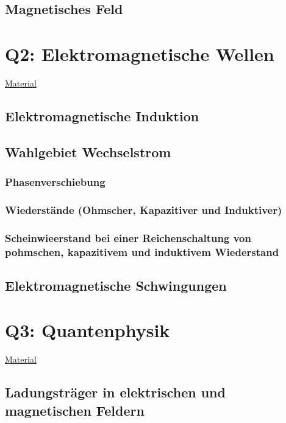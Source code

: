 \documentclass{article}
\begin{document}
        \subsection{Magnetisches Feld}

    \section{Q2: Elektromagnetische Wellen}

    \href{https://gcm.schule/material/2023/physik/lk12/#q1}{Material}
    	\subsection{Elektromagnetische Induktion}
    	
    	\subsection{Wahlgebiet Wechselstrom}
    	
    		\subsubsection{Phasenverschiebung}
    		
    		\subsubsection{Wiederstände (Ohmscher, Kapazitiver und Induktiver)}
    		
    		\subsubsection{Scheinwieerstand bei einer Reichenschaltung von pohmschen, kapazitivem und induktivem Wiederstand}
    	
    	\subsection{Elektromagnetische Schwingungen}

    \section{Q3: Quantenphysik}

    \href{https://gcm.schule/material/2022/physik/lk13/}{Material}
    
    	\subsection{Ladungsträger in elektrischen und magnetischen Feldern}
    	
\end{document}
